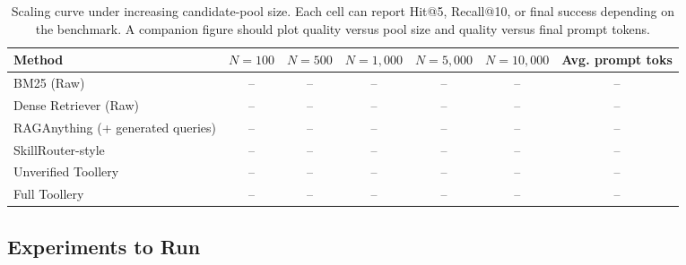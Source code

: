 \begin{table}[t]
\centering
\small
\begin{tabular}{lcccccc}
\hline
\textbf{Method} &
\textbf{$N=100$} &
\textbf{$N=500$} &
\textbf{$N=1{,}000$} &
\textbf{$N=5{,}000$} &
\textbf{$N=10{,}000$} &
\textbf{Avg. prompt toks} \\
\hline
BM25 (Raw) & -- & -- & -- & -- & -- & -- \\
Dense Retriever (Raw) & -- & -- & -- & -- & -- & -- \\
RAGAnything (+ generated queries) & -- & -- & -- & -- & -- & -- \\
SkillRouter-style & -- & -- & -- & -- & -- & -- \\
Unverified Toollery & -- & -- & -- & -- & -- & -- \\
Full Toollery & -- & -- & -- & -- & -- & -- \\
\hline
\end{tabular}
\caption{Scaling curve under increasing candidate-pool size. Each cell can
report Hit@5, Recall@10, or final success depending on the benchmark. A companion
figure should plot quality versus pool size and quality versus final prompt
tokens.}
\label{tab:scaling-curve}
\end{table}

\subsection{Experiments to Run}
\label{subsec:experiments-to-run}

